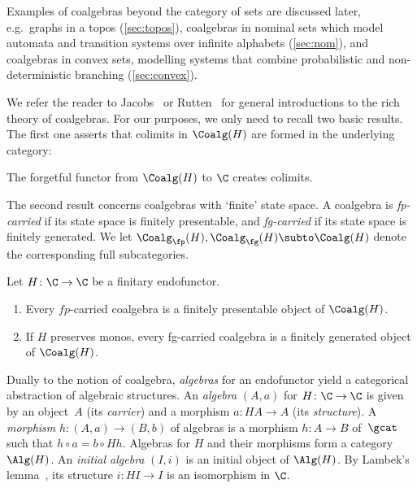 \documentclass[a4paper,UKenglish, autoref, numberwithinsect, final]{lipics-v2021}
\numberwithin{equation}{section}
\newcommand{\resetCurThmBraces}{%
  \gdef\curThmBraceOpen{(}%
  \gdef\curThmBraceClose{)}}
\newcommand{\removeThmBraces}{%
  \gdef\curThmBraceOpen{}%
  \gdef\curThmBraceClose{}}
\newenvironment{notheorembrackets}{\removeThmBraces}{\resetCurThmBraces}
\theoremstyle{plain}
\theoremstyle{definition}
\begin{document}
Examples of coalgebras beyond the category of sets are discussed later, e.g.\ graphs in a topos (\autoref{sec:topos}), coalgebras in nominal sets which model automata and transition systems over
  infinite alphabets (\autoref{sec:nom}), and 
  coalgebras in convex sets, modelling systems that combine probabilistic and non-deterministic branching
  (\autoref{sec:convex}).

We refer the reader to Jacobs~\cite{jacobs16} or Rutten~\cite{rutten00} for general introductions to the rich theory of coalgebras. For our purposes, we only need to recall two basic results. The first one asserts that colimits in $\Coalg(H)$ are formed in the underlying category:

\begin{notheorembrackets}
\begin{lemma}\label{lem:colimits-coalg}
The forgetful functor from $\Coalg(H)$ to $\C$ creates colimits.
\end{lemma}
\end{notheorembrackets}

The second result concerns coalgebras with `finite' state space. A coalgebra is \emph{fp-carried} if its state space is finitely presentable, and \emph{fg-carried} if its state space is finitely generated. We let $\Coalg_\fp(H), \Coalg_\fg(H)\subto \Coalg(H)$ denote the corresponding full subcategories. 

\begin{notheorembrackets}
\begin{lemma}[{\cite[Lem.~3.2]{ap04}}]\label{lem:fp-fg-coalg} Let $H\colon \C\to \C$ be a finitary endofunctor.
\begin{enumerate}
\item Every $fp$-carried coalgebra is a finitely presentable object of $\Coalg(H)$.
\item If $H$ preserves monos, every fg-carried coalgebra is a finitely generated object of $\Coalg(H)$.
\end{enumerate}
\end{lemma}
\end{notheorembrackets}

Dually to the notion of coalgebra, \emph{algebras} for an endofunctor yield a categorical abstraction of algebraic structures. An \emph{algebra} $(A,a)$ for $H\colon \C\to \C$ is given by an object~$A$ (its \emph{carrier}) and a morphism $a\colon H A\to A$ (its \emph{structure}). A
\emph{morphism} $h\colon (A,a) \to (B,b)$ of algebras is a morphism
$h\colon A\to B$ of~$\gcat$ such that $h\circ a = b\circ H h$.  Algebras
for $H$ and their morphisms form a category $\Alg(H)$. An \emph{initial algebra} $(I,i)$ is an initial object of $\Alg(H)$. By Lambek's lemma~\cite{lambek68}, its structure $i\colon HI\to I$ is an isomorphism in $\C$.
\end{document}
